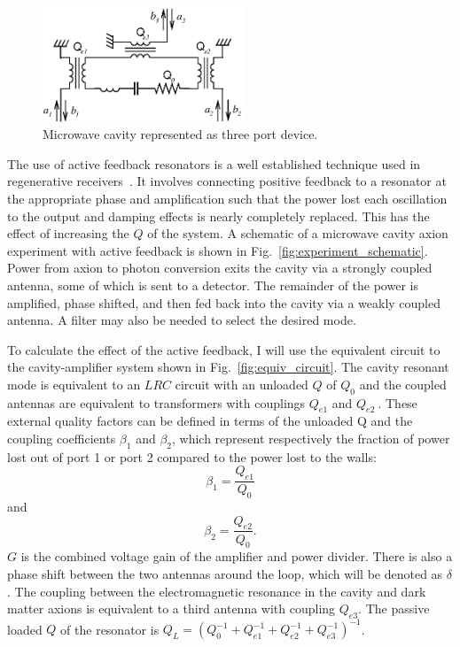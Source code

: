 \documentclass[aps,prl,twocolumn,groupedaddress]{revtex4-1}
\begin{document}
\begin{figure}
\includegraphics[width=6cm]{figs/amplitude_definitions.eps}
\caption{\label{fig:amplitude_defs} Microwave cavity represented as three port device.}
\end{figure}

The use of active feedback resonators is a well established technique used in regenerative receivers~\cite{armstrong1914wireless}.
It involves connecting positive feedback to a resonator at the appropriate phase and amplification such that the power lost each oscillation to the output and damping effects is nearly completely replaced.  
This has the effect of increasing the $Q$ of the system.
A schematic of a microwave cavity axion experiment with active feedback is shown in Fig.~\ref{fig:experiment_schematic}.   Power from axion to photon conversion exits the cavity via a strongly coupled antenna, some of which is sent to a detector.  The remainder of the power is amplified, phase shifted, and then fed back into the cavity via a weakly coupled antenna.  A filter may also be needed to select the desired mode. 

To calculate the effect of the active feedback, I will use the equivalent circuit to the cavity-amplifier system shown in Fig.~\ref{fig:equiv_circuit}.  The cavity resonant mode is equivalent to an $LRC$ circuit with an unloaded $Q$ of $Q_0$ and the coupled antennas are equivalent to transformers with couplings $Q_{e1}$ and $Q_{e2}~$\cite{Montgomery:1948}.  These external quality factors can be defined in terms of the unloaded Q and the coupling coefficients $\beta_1$ and $\beta_2$, which represent respectively the fraction of power lost out of port 1 or port 2 compared to the power lost to the walls: $$\beta_1 = \frac{Q_{e1} }{Q_0}$$ and $$\beta_2 = \frac{Q_{e2}}{Q_0}.$$ $G$ is the combined voltage gain of the amplifier and power divider.  There is also a phase shift between the two antennas around the loop, which will be denoted as $\delta$.  The coupling between the electromagnetic resonance in the cavity and dark matter axions is equivalent to a third antenna with coupling $Q_{e3}$.  The passive loaded $Q$ of the resonator is $Q_L=\left(Q_0^{-1}+Q_{e1}^{-1}+Q_{e2}^{-1}+Q_{e3}^{-1}\right)^{-1}$.
\end{document}
